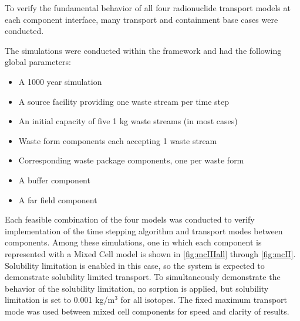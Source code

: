 
To verify the fundamental behavior of all four \Cyder radionuclide transport models at
each component interface, many transport and containment base cases were
conducted.

The simulations were conducted within the \Cyclus framework and had the
following global parameters:

\begin{itemize}
\item{A 1000 year simulation}
\item{A source facility providing one waste stream per time step}
\item{An initial capacity of five 1 kg waste streams (in most cases)}
\item{Waste form components each accepting 1 waste stream}
\item{Corresponding waste package components, one per waste form}
\item{A buffer component}
\item{A far field component}
\end{itemize}


Each feasible combination of the four models was conducted to verify
implementation of the time stepping algorithm and transport modes between
components. Among these simulations, one in which each component is represented with a Mixed
Cell model is shown in \ref{fig:mcIIIall} through \ref{fig:mcII}.  Solubility
limitation is enabled in this case, so the system is expected to demonstrate
solubility limited transport.  To simultaneously demonstrate the behavior of
the solubility limitation, no sorption is applied, but solubility limitation is
set to 0.001 kg/m$^3$ for all isotopes.  The fixed maximum transport mode was
used between mixed cell components for speed and clarity of results.



\FloatBarrier

